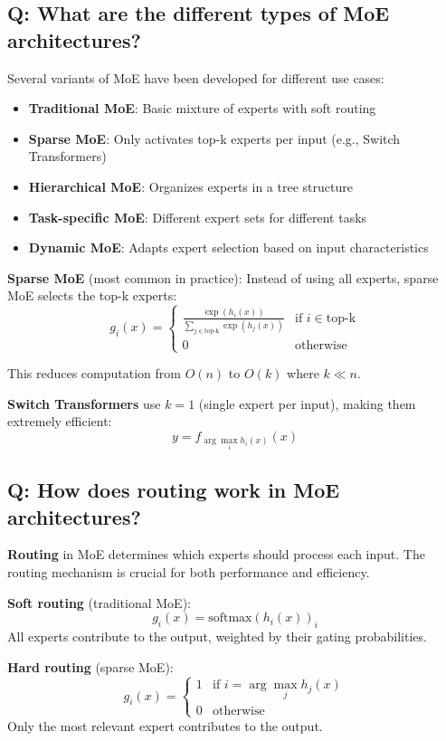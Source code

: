 \subsection*{Q: What are the different types of MoE architectures?}
Several variants of MoE have been developed for different use cases:

\begin{itemize}
	\item \textbf{Traditional MoE}: Basic mixture of experts with soft routing
	\item \textbf{Sparse MoE}: Only activates top-k experts per input (e.g., Switch Transformers)
	\item \textbf{Hierarchical MoE}: Organizes experts in a tree structure
	\item \textbf{Task-specific MoE}: Different expert sets for different tasks
	\item \textbf{Dynamic MoE}: Adapts expert selection based on input characteristics
\end{itemize}

\textbf{Sparse MoE} (most common in practice):
Instead of using all experts, sparse MoE selects the top-k experts:
\[
	g_i(x) = \begin{cases}
		\frac{\exp(h_i(x))}{\sum_{j \in \text{top-k}} \exp(h_j(x))} & \text{if } i \in \text{top-k} \\
		0                                                           & \text{otherwise}
	\end{cases}
\]

This reduces computation from \(O(n)\) to \(O(k)\) where \(k \ll n\).

\textbf{Switch Transformers} use \(k=1\) (single expert per input), making them extremely efficient:
\[
	y = f_{\arg\max_i h_i(x)}(x)
\]

\subsection*{Q: How does routing work in MoE architectures?}
\textbf{Routing} in MoE determines which experts should process each input. The routing mechanism is crucial for both performance and efficiency.

\textbf{Soft routing} (traditional MoE):
\[
	g_i(x) = \text{softmax}(h_i(x))_i
\]
All experts contribute to the output, weighted by their gating probabilities.

\textbf{Hard routing} (sparse MoE):
\[
	g_i(x) = \begin{cases}
		1 & \text{if } i = \arg\max_j h_j(x) \\
		0 & \text{otherwise}
	\end{cases}
\]
Only the most relevant expert contributes to the output.

